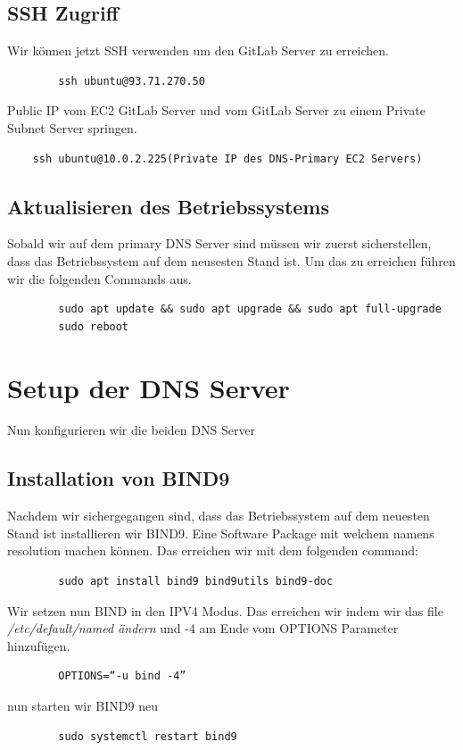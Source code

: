 \documentclass[a4paper,12pt]{article}
\begin{document}
\subsection{SSH Zugriff}
Wir können jetzt SSH verwenden um den GitLab Server zu erreichen.
\begin{verbatim}
		ssh ubuntu@93.71.270.50
\end{verbatim}
Public IP vom EC2 GitLab Server und vom GitLab Server zu einem Private Subnet Server springen.

\begin{verbatim}
	ssh ubuntu@10.0.2.225(Private IP des DNS-Primary EC2 Servers)
\end{verbatim}


\subsection{Aktualisieren des Betriebssystems}

Sobald wir auf dem primary DNS Server sind müssen wir zuerst sicherstellen, dass das Betriebssystem auf dem neusesten Stand ist.
Um das zu erreichen führen wir die folgenden Commands aus.
\begin{verbatim}
		sudo apt update && sudo apt upgrade && sudo apt full-upgrade
		sudo reboot
\end{verbatim}


\section{Setup der DNS Server}
Nun konfigurieren wir die beiden DNS Server

\subsection{Installation von BIND9}
Nachdem wir sichergegangen sind, dass das Betriebssystem auf dem neuesten Stand ist installieren wir BIND9. Eine Software Package mit welchem namens resolution machen können. Das erreichen wir mit dem folgenden command:
\begin{verbatim}
		sudo apt install bind9 bind9utils bind9-doc
\end{verbatim}

Wir setzen nun BIND in den IPV4 Modus. Das erreichen wir indem wir das file \textit{/etc/default/named ändern} und -4 am Ende vom OPTIONS Parameter hinzufügen.
\begin{verbatim}
		OPTIONS=“-u bind -4”
\end{verbatim}
nun starten wir BIND9 neu
\begin{verbatim}
		sudo systemctl restart bind9
\end{verbatim}
\end{document}
